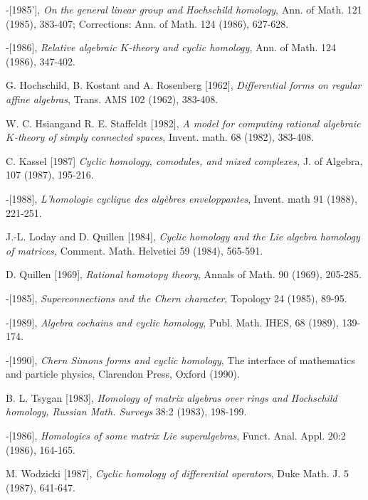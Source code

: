 \begin{thebibliography}{99}
\quad-[1985'], {\em On the general linear group and Hochschild homology},
Ann. of Math. 121 (1985), 383-407; Corrections: Ann. of Math. 124
(1986), 627-628.

\quad-[1986], {\em Relative algebraic $K$-theory and cyclic homology},
Ann. of Math. 124 (1986), 347-402.

  G. Hochschild, B. Kostant and A. Rosenberg [1962], {\em
  Differential forms on regular affine algebras}, Trans. AMS 102
  (1962), 383-408.

  W. C. Hsiang\pageoriginale and R. E. Staffeldt [1982],
  {\em A model for computing rational algebraic $K$-theory of simply
    connected spaces}, Invent. math. 68 (1982), 383-408.

  C. Kassel [1987] {\em Cyclic homology, comodules, and
  mixed complexes,} J. of Algebra, 107 (1987), 195-216.

\quad-[1988], {\em L'homologie cyclique des alg\`ebres enveloppantes},
Invent. math 91 (1988), 221-251.

   J.-L. Loday and D. Quillen [1984], {\em Cyclic homology
  and the Lie algebra homology of matrices,} Comment. Math. Helvetici
  59 (1984), 565-591.

  D. Quillen [1969], {\em Rational homotopy theory},
  Annals of Math. 90 (1969), 205-285.

\quad-[1985], {\em Superconnections and the Chern character}, Topology 24
(1985), 89-95.

\quad-[1989], {\em Algebra cochains and cyclic homology}, Publ. Math. IHES,
68 (1989), 139-174.

\quad-[1990], {\em Chern Simons forms and cyclic homology}, The interface
of mathematics and particle physics, Clarendon Press, Oxford (1990).


  B. L. Tsygan [1983], {\em Homology of matrix algebras over
  rings and Hochschild homology, Russian Math. Surveys} 38:2 (1983), 198-199.

\quad-[1986], {\em Homologies of some matrix Lie superalgebras},
Funct. Anal. Appl. 20:2 (1986), 164-165.

  M. Wodzicki [1987], {\em Cyclic homology of 
  differential operators}, Duke Math. J. 5 (1987), 641-647.
\end{thebibliography}


